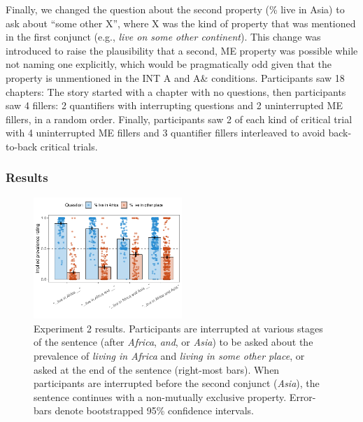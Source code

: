 \documentclass[10pt,letterpaper]{article}
\newcommand{\mh}[1]{{\textcolor{Blue}{[mh: #1]}}}
\begin{document}
Finally, we changed the question about the second property (\% live in Asia) to ask about ``some other X'', where X was the kind of property that was mentioned in the first conjunct (e.g., \emph{live on some other continent}).
This change was introduced to raise the plausibility that a second, ME property was possible while not  naming one explicitly, which would be pragmatically odd given that the property is unmentioned in the INT A and A\& conditions. 
Participants saw 18 chapters: The story started with a chapter with no questions, then participants saw 4 fillers: 2 quantifiers with interrupting questions and 2 uninterrupted ME fillers, in a random order. Finally, participants saw 2 of each kind of critical trial with 4 uninterrupted ME fillers and 3 quantifier fillers interleaved to avoid back-to-back critical trials. 
 \subsubsection{Results}
 \vspace{-0.5cm}
\begin{figure}[h]
  \centering
    \includegraphics[width=0.5\textwidth]{expt3_summary}
    \vspace{-1cm}
  \caption{Experiment 2 results. Participants are interrupted at various stages of the sentence (after \emph{Africa}, \emph{and}, or \emph{Asia}) to be asked about the prevalence of \emph{living in Africa} and \emph{living in some other place}, or asked at the end of the sentence (right-most bars). When participants are interrupted before the second conjunct (\emph{Asia}), the sentence continues with a non-mutually exclusive property. Error-bars denote bootstrapped 95\% confidence intervals.}
    \label{fig:expt3}
        \vspace{-0.3cm}
  \end{figure}
  
% 
\end{document}
